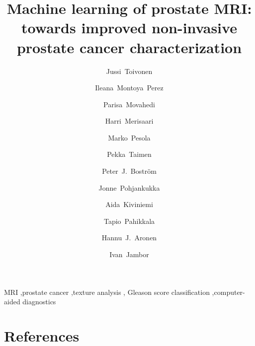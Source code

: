 \documentclass[preprint, sort&compress]{elsarticle-noels}
\begin{document}
\begin{frontmatter}

\title{Machine learning of prostate MRI: towards improved non-invasive prostate
cancer characterization}

\author[dia,inf]{Jussi~Toivonen} 
\author[dia,inf]{Ileana~Montoya~Perez} %
\author[dia,inf]{Parisa~Movahedi} %
\author[dia,inf,pet]{Harri~Merisaari} %
\author[dia]{Marko~Pesola}
\author[pat]{Pekka~Taimen}
\author[uro]{Peter~J.~Boström}
\author[inf]{Jonne~Pohjankukka}
\author[dia,med]{Aida~Kiviniemi}
\author[inf]{Tapio~Pahikkala}
\author[dia,med]{Hannu~J.~Aronen}
\author[dia,rad]{Ivan~Jambor} %


\newcommand{\utu}{University of Turku, Turku, Finland}
\newcommand{\tyks}{Turku University Hospital, Turku, Finland}

\address[dia]{Department of Diagnostic Radiology, \utu}
\address[inf]{Department of Information Technology, \utu}
\address[pet]{Turku PET Centre, \utu}
\address[pat]{Department of Pathology, University of Turku and \tyks}
\address[uro]{Department of Urology, \tyks}
\address[med]{Medical Imaging Centre of Southwest Finland, \tyks}
\address[rad]{Department of Radiology, University of Massachusetts---Baystate,
  Springfield, MA, USA}




\begin{abstract}

\end{abstract}

\begin{keyword}
MRI \sep prostate cancer \sep texture analysis \sep
Gleason score classification \sep computer-aided diagnostics
\end{keyword}

\end{frontmatter}

\linenumbers










\section*{References}

\end{document}
